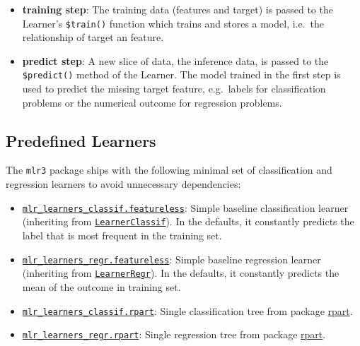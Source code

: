 \documentclass[
]{scrbook}
\providecommand{\tightlist}{%
  \setlength{\itemsep}{0pt}\setlength{\parskip}{0pt}}
\begin{document}
\begin{itemize}
\tightlist
\item
  \textbf{training step}: The training data (features and target) is passed to the Learner's \texttt{\$train()} function which trains and stores a model, i.e.~the relationship of target an feature.
\item
  \textbf{predict step}: A new slice of data, the inference data, is passed to the \texttt{\$predict()} method of the Learner.
  The model trained in the first step is used to predict the missing target feature, e.g.~labels for classification problems or the numerical outcome for regression problems.
\end{itemize}

\hypertarget{predefined-learners}{%
\subsection{Predefined Learners}\label{predefined-learners}}

The \texttt{mlr3} package ships with the following minimal set of classification and regression learners to avoid unnecessary dependencies:

\begin{itemize}
\tightlist
\item
  \href{https://mlr3.mlr-org.com/reference/mlr_learners_classif.featureless.html}{\texttt{mlr\_learners\_classif.featureless}}: Simple baseline classification learner (inheriting from \href{https://mlr3.mlr-org.com/reference/LearnerClassif.html}{\texttt{LearnerClassif}}).
  In the defaults, it constantly predicts the label that is most frequent in the training set.
\item
  \href{https://mlr3.mlr-org.com/reference/mlr_learners_regr.featureless.html}{\texttt{mlr\_learners\_regr.featureless}}: Simple baseline regression learner (inheriting from \href{https://mlr3.mlr-org.com/reference/LearnerRegr.html}{\texttt{LearnerRegr}}).
  In the defaults, it constantly predicts the mean of the outcome in training set.
\item
  \href{https://mlr3.mlr-org.com/reference/mlr_learners_classif.rpart.html}{\texttt{mlr\_learners\_classif.rpart}}: Single classification tree from package \href{https://cran.r-project.org/package=rpart}{rpart}.
\item
  \href{https://mlr3.mlr-org.com/reference/mlr_learners_regr.rpart.html}{\texttt{mlr\_learners\_regr.rpart}}: Single regression tree from package \href{https://cran.r-project.org/package=rpart}{rpart}.
\end{itemize}
\end{document}
